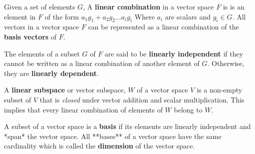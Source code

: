 \documentclass[12pt]{report}
\begin{document}
\bigskip

Given a set of elements $G$, A \textbf{linear combination} in a vector space $F$ is is an element in $F$ of the form $a_1g_1+a_2g_{2} \dots a_ig_i$ Where $a_i$ are scalars and $g_{i}\in G$.
All vectors in a vector space $F$ can be represented as a linear combination of the \textbf{basis vectors} of $F$.

The elements of a subset $G$ of $F$ are said to be \textbf{linearly independent} if they cannot be written as a linear combination of another element of $G$. Otherwise, they are \textbf{linearly dependent}.

A \textbf{linear subspace} or vector subspace, $W$ of a vector space $V$ is a non-empty subset of $V$ that is \textit{closed} under vector addition and scalar multiplication. This implies that every linear combination of elements of $W$ belong to $W$.

A subset of a vector space is a \textbf{basis} if its elements are linearly independent and *span* the vector space. All **bases** of a vector space have the same cardinality which is called the \textbf{dimension} of the vector space.
\end{document}
